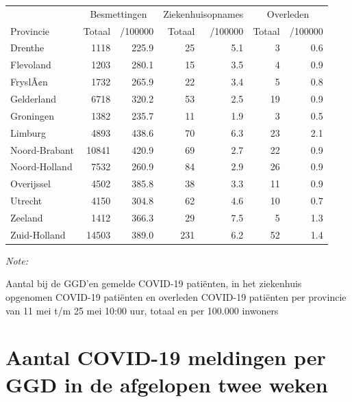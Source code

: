 \documentclass[
  english,
  man,floatsintext]{apa6}
\begin{document}
\begin{table}
\centering
\begin{threeparttable}
\begin{tabular}{lrrrrrr}
\toprule
\multicolumn{1}{c}{ } & \multicolumn{2}{c}{Besmettingen} & \multicolumn{2}{c}{Ziekenhuisopnames} & \multicolumn{2}{c}{Overleden} \\
\cmidrule(l{3pt}r{3pt}){2-3} \cmidrule(l{3pt}r{3pt}){4-5} \cmidrule(l{3pt}r{3pt}){6-7}
Provincie & Totaal & /100000 & Totaal & /100000 & Totaal & /100000\\
\midrule
Drenthe & 1118 & 225.9 & 25 & 5.1 & 3 & 0.6\\
Flevoland & 1203 & 280.1 & 15 & 3.5 & 4 & 0.9\\
FryslÃ¢n & 1732 & 265.9 & 22 & 3.4 & 5 & 0.8\\
Gelderland & 6718 & 320.2 & 53 & 2.5 & 19 & 0.9\\
Groningen & 1382 & 235.7 & 11 & 1.9 & 3 & 0.5\\
Limburg & 4893 & 438.6 & 70 & 6.3 & 23 & 2.1\\
Noord-Brabant & 10841 & 420.9 & 69 & 2.7 & 22 & 0.9\\
Noord-Holland & 7532 & 260.9 & 84 & 2.9 & 26 & 0.9\\
Overijssel & 4502 & 385.8 & 38 & 3.3 & 11 & 0.9\\
Utrecht & 4150 & 304.8 & 62 & 4.6 & 10 & 0.7\\
Zeeland & 1412 & 366.3 & 29 & 7.5 & 5 & 1.3\\
Zuid-Holland & 14503 & 389.0 & 231 & 6.2 & 52 & 1.4\\
\bottomrule
\end{tabular}
\begin{tablenotes}
\item \textit{Note: } 
\item Aantal bij de GGD’en gemelde COVID-19 patiënten, in het ziekenhuis opgenomen COVID-19 patiënten en overleden COVID-19 patiënten per provincie van 11 mei t/m 25 mei 10:00 uur, totaal en per 100.000 inwoners
\end{tablenotes}
\end{threeparttable}
\end{table}

\newpage

\hypertarget{aantal-covid-19-meldingen-per-ggd-in-de-afgelopen-twee-weken}{%
\section{Aantal COVID-19 meldingen per GGD in de afgelopen twee weken}\label{aantal-covid-19-meldingen-per-ggd-in-de-afgelopen-twee-weken}}
\end{document}
